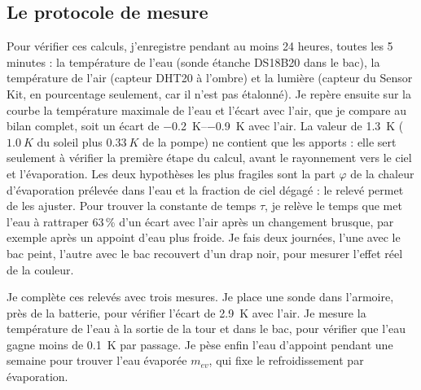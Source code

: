 \subsection{Le protocole de mesure}

Pour vérifier ces calculs, j'enregistre pendant au moins 24 heures, toutes les 5 minutes : la température de l'eau (sonde étanche DS18B20 dans le bac), la température de l'air (capteur DHT20 à l'ombre) et la lumière (capteur du Sensor Kit, en pourcentage seulement, car il n'est pas étalonné). Je repère ensuite sur la courbe la température maximale de l'eau et l'écart avec l'air, que je compare au bilan complet, soit un écart de \qtyrange{-0,2}{-0,9}{K} avec l'air. La valeur de \qty{1,3}{K} ($\qty{1,0}{K}$ du soleil plus $\qty{0,33}{K}$ de la pompe) ne contient que les apports : elle sert seulement à vérifier la première étape du calcul, avant le rayonnement vers le ciel et l'évaporation. Les deux hypothèses les plus fragiles sont la part $\varphi$ de la chaleur d'évaporation prélevée dans l'eau et la fraction de ciel dégagé : le relevé permet de les ajuster. Pour trouver la constante de temps $\tau$, je relève le temps que met l'eau à rattraper 63\,\% d'un écart avec l'air après un changement brusque, par exemple après un appoint d'eau plus froide. Je fais deux journées, l'une avec le bac peint, l'autre avec le bac recouvert d'un drap noir, pour mesurer l'effet réel de la couleur.

Je complète ces relevés avec trois mesures. Je place une sonde dans l'armoire, près de la batterie, pour vérifier l'écart de \qty{2,9}{K} avec l'air. Je mesure la température de l'eau à la sortie de la tour et dans le bac, pour vérifier que l'eau gagne moins de \qty{0,1}{K} par passage. Je pèse enfin l'eau d'appoint pendant une semaine pour trouver l'eau évaporée $m_{ev}$, qui fixe le refroidissement par évaporation.
